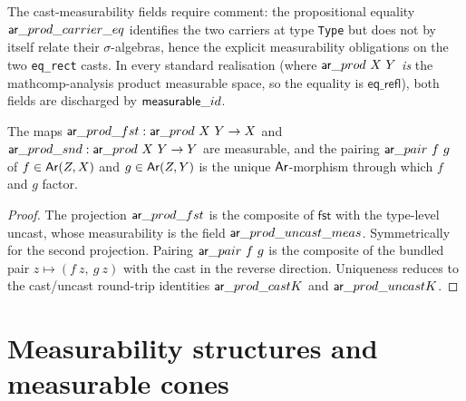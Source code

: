 The cast-measurability fields require comment: the propositional
equality $\mathsf{ar}\_prod\_carrier\_eq$ identifies the two carriers at type
\texttt{Type} but does not by itself relate their $\sigma$-algebras,
hence the explicit measurability obligations on the two
\texttt{eq\_rect} casts. In every standard realisation
(where $\mathsf{ar}\_prod\ X\ Y$ \emph{is} the mathcomp-analysis product
measurable space, so the equality is $\mathsf{eq\_refl}$), both fields
are discharged by $\mathsf{measurable}\_id$.

\begin{lemma}\label{lem:ar-prod-up}
  \rocqok
  \rocqok
  \rocqok
  The maps $\mathsf{ar}\_prod\_fst : \mathsf{ar}\_prod\ X\ Y \to X$ and
  $\ar\_prod\_snd : \ar\_prod\ X\ Y \to Y$ are measurable, and the
  pairing $\ar\_pair\ f\ g$ of $f \in \mathsf{Ar}(Z, X)$ and $g \in \mathsf{Ar}(Z, Y)$
  is the unique $\mathsf{Ar}$-morphism through which $f$ and $g$ factor.
\end{lemma}
\begin{proof}
  The projection $\mathsf{ar}\_prod\_fst$ is the composite of
  $\mathsf{fst}$ with the type-level uncast, whose measurability is
  the field $\mathsf{ar}\_prod\_uncast\_meas$. Symmetrically for the second
  projection. Pairing $\ar\_pair\ f\ g$ is the composite of the
  bundled pair $z \mapsto (f\ z,\ g\ z)$ with the cast in the reverse
  direction. Uniqueness reduces to the cast/uncast round-trip
  identities $\mathsf{ar}\_prod\_castK$ and $\mathsf{ar}\_prod\_uncastK$.
\end{proof}

\section{Measurability structures and measurable
  cones}\label{sec:mcones-def}


